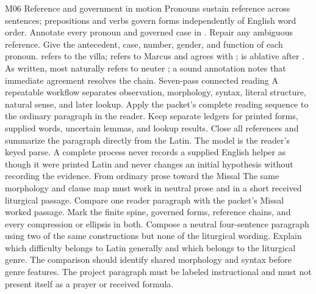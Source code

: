 \begin{courseunit}{M06}
\SubmoduleExtension
  {Reference and government in motion}
  {Pronouns sustain reference across sentences; prepositions and verbs govern
  forms independently of English word order.}
  {Annotate every pronoun and governed case in .  Repair any ambiguous reference.}
  {Give the antecedent, case, number, gender, and function of each pronoun.}
  { refers to the villa;  refers to Marcus and agrees
  with ;  is ablative after .  As written,
   most naturally refers to neuter ; a sound
  annotation notes that immediate agreement resolves the chain.}
\SubmoduleExtension
  {Seven-pass connected reading}
  {A repeatable workflow separates observation, morphology, syntax, literal
  structure, natural sense, and later lookup.}
  {Apply the packet's complete reading sequence to the ordinary paragraph in
  the reader.  Keep separate ledgers for printed forms, supplied words,
  uncertain lemmas, and lookup results.}
  {Close all references and summarize the paragraph directly from the Latin.}
  {The model is the reader's keyed parse.  A complete process never records a
  supplied English helper as though it were printed Latin and never changes an
  initial hypothesis without recording the evidence.}
\SubmoduleExtension
  {From ordinary prose toward the Missal}
  {The same morphology and clause map must work in neutral prose and in a short
  received liturgical passage.}
  {Compare one reader paragraph with the packet's Missal worked passage.  Mark
  the finite spine, governed forms, reference chains, and every compression or
  ellipsis in both.  Compose a neutral four-sentence paragraph using two of the
  same constructions but none of the liturgical wording.}
  {Explain which difficulty belongs to Latin generally and which belongs to
  the liturgical genre.}
  {The comparison should identify shared morphology and syntax before genre
  features.  The project paragraph must be labeled instructional and must not
  present itself as a prayer or received formula.}
\end{courseunit}

